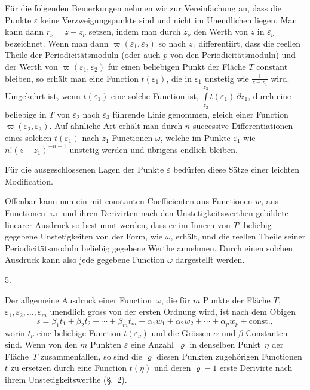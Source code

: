 \documentclass[a4paper,12pt,leqno]{article}
\begin{document}
F\"{u}r die folgenden Bemerkungen nehmen wir zur Vereinfachung
an, dass die Punkte $\varepsilon$ keine Verzweigungspunkte sind
und nicht im Unendlichen liegen.  Man kann dann
$r_\nu = z - z_\nu$ setzen, indem man durch $z_\nu$ den Werth von
$z$ in $\varepsilon_\nu$ bezeichnet.  Wenn man dann
$\varpi(\varepsilon_1, \varepsilon_2)$
so nach $z_1$ differentiirt, dass die reellen Theile der
Periodicit\"{a}tsmoduln (oder auch $p$ von den
Periodicit\"{a}tsmoduln) und der Werth von
$\varpi(\varepsilon_1, \varepsilon_2)$
f\"{u}r einen beliebigen Punkt der Fl\"{a}che $T$ constant
bleiben, so erh\"{a}lt man eine Function $t(\varepsilon_1)$, die
in $\varepsilon_1$ unstetig wie
$\displaystyle \frac{1}{z - z_1}$
wird.  Umgekehrt ist, wenn $t(\varepsilon_1)$ eine solche
Function ist,
$\displaystyle \int\limits_{z_2}^{z_3} t(\varepsilon_1) \, \partial z_1$,
durch eine beliebige in $T$ von $\varepsilon_2$ nach
$\varepsilon_3$ f\"{u}hrende Linie genommen, gleich einer
Function
$\varpi(\varepsilon_2, \varepsilon_3)$.
Auf \"{a}hnliche Art erh\"{a}lt man durch $n$ successive
Differentiationen eines solchen $t(\varepsilon_1)$ nach $z_1$
Functionen $\omega$, welche im Punkte $\varepsilon_1$ wie
$n! {(z - z_1)^{-n-1}}$
unstetig werden und \"{u}brigens endlich bleiben.

F\"{u}r die ausgeschlossenen Lagen der Punkte $\varepsilon$
bed\"{u}rfen diese S\"{a}tze einer leichten Modification.

Offenbar kann nun ein mit constanten Coefficienten aus Functionen
$w$, aus Functionen $\varpi$ und ihren Derivirten nach
den Unstetigkeitswerthen gebildete linearer Ausdruck so bestimmt
werden, dass er im Innern von $T'$ beliebig gegebene
Unstetigkeiten von der Form, wie $\omega$, erh\"{a}lt, und die
reellen Theile seiner Periodicit\"{a}tsmoduln beliebig gegebene
Werthe annehmen.  Durch einen solchen Ausdruck kann also jede
gegebene Function $\omega$ dargestellt werden.

\medbreak

\centerline{5.}

\nobreak\medskip

Der allgemeine Ausdruck einer Function~$\omega$, die f\"{u}r $m$
Punkte der Fl\"{a}che $T$,
$\varepsilon_1, \varepsilon_2,\ldots, \varepsilon_m$
unendlich gross von der ersten Ordnung wird, ist nach dem Obigen
\[ s =  \beta_1 t_1  + \beta_2 t_2 + \cdots + \beta_m t_m
      + \alpha_1 w_1 + \alpha_2 w_2 + \cdots
      + \alpha_p w_p + \mbox{const.},\]
worin $t_\nu$ eine beliebige Function $t(\varepsilon_\nu)$ und
die Gr\"{o}ssen $\alpha$ und $\beta$ Constanten sind.  Wenn von
den $m$ Punkten $\varepsilon$ eine Anzahl~$\varrho$ in denselben
Punkt~$\eta$ der Fl\"{a}che~$T$ zusammenfallen, so sind die
$\varrho$ diesen Punkten zugeh\"{o}rigen Functionen $t$ zu
ersetzen durch eine Function $t(\eta)$ und deren $\varrho - 1$
erste Derivirte nach ihrem Unstetigkeitswerthe (\S.~2).
\end{document}
